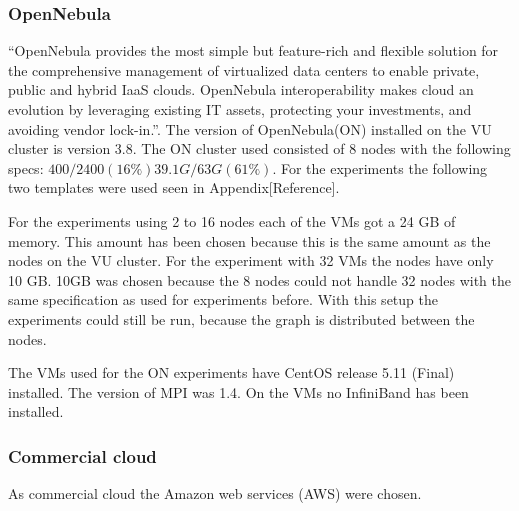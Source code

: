 \subsubsection{OpenNebula}
\label{hw:opennebula}
``OpenNebula  provides the most simple but feature-rich and flexible solution for the comprehensive management of virtualized data centers to enable private, public and hybrid IaaS clouds. OpenNebula interoperability makes cloud an evolution by leveraging existing IT assets, protecting your investments, and avoiding vendor lock-in.''\cite{opennebula}. The version of OpenNebula(ON) installed on the VU cluster is version 3.8. The ON cluster used consisted of 8 nodes with the following specs: $400 / 2400 (16\%)  39.1G / 63G (61\%)$. For the experiments the following two templates were used seen in Appendix[Reference].

For the experiments using 2 to 16 nodes each of the VMs got a 24 GB of memory. This amount has been chosen because this is the same amount as the nodes on the VU cluster. For the experiment with 32 VMs the nodes have only 10 GB. 10GB was chosen because the 8 nodes could not handle 32 nodes with the same specification as used for experiments before. With this setup the experiments could still be run, because the graph is distributed between the nodes. 

The VMs used for the ON experiments have CentOS release 5.11 (Final) installed. The version of MPI was 1.4. On the VMs no InfiniBand has been installed. 


\subsubsection{Commercial cloud}
As commercial cloud the Amazon web services (AWS) were chosen.
